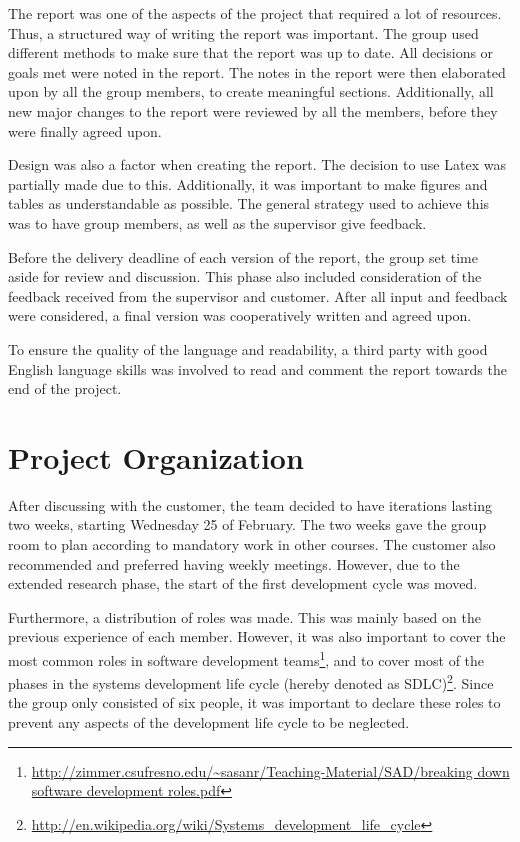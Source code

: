 The report was one of the aspects of the project that required a lot of resources. Thus, a structured way of writing the report was important. The group used different methods to make sure that the report was up to date. All decisions or goals met were noted in the report. The notes in the report were then elaborated upon by all the group members, to create meaningful sections. Additionally, all new major changes to the report were reviewed by all the members, before they were finally agreed upon.

Design was also a factor when creating the report. The decision to use Latex was partially made due to this. Additionally, it was important to make figures and tables as understandable as possible. The general strategy used to achieve this was to have group members, as well as the supervisor give feedback.

Before the delivery deadline of each version of the report, the group set time aside for review and discussion. This phase also included consideration of the feedback received from the supervisor and customer. After all input and feedback were considered, a final version was cooperatively written and agreed upon.

To ensure the quality of the language and readability, a third party with good English language skills was involved to read and comment the report towards the end of the project.

\section{Project Organization}
\label{sec:process_and_methodology-project_organization}

After discussing with the customer, the team decided to have iterations lasting two weeks, starting Wednesday 25 of February. The two weeks gave the group room to plan according to mandatory work in other courses. The customer also recommended and preferred having weekly meetings. However, due to the extended research phase, the start of the first development cycle was moved.

Furthermore, a distribution of roles was made. This was mainly based on the previous experience of each member. However, it was also important to cover the most common roles in software development teams\footnote{\url{http://zimmer.csufresno.edu/~sasanr/Teaching-Material/SAD/breaking down software development roles.pdf}}, and to cover most of the phases in the systems development life cycle (hereby denoted as SDLC)\footnote{\url{http://en.wikipedia.org/wiki/Systems_development_life_cycle}}. Since the group only consisted of six people, it was important to declare these roles to prevent any aspects of the development life cycle to be neglected.

